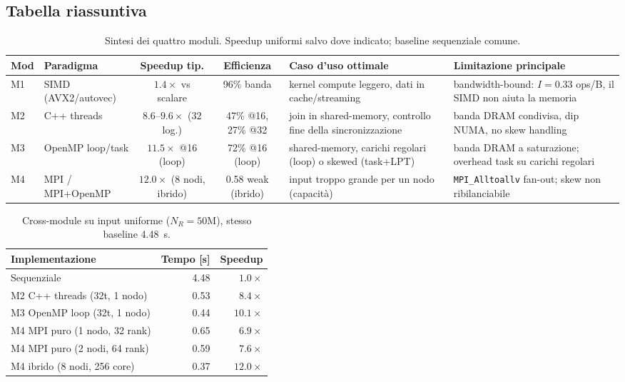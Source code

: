 \documentclass[11pt,a4paper]{article}
\theoremstyle{remark}
\begin{document}
\subsection{Tabella riassuntiva}

\begin{table}[H]
\centering\footnotesize
\setlength{\tabcolsep}{4pt}
\begin{tabularx}{\textwidth}{@{}llcclX@{}}
\toprule
\textbf{Mod} & \textbf{Paradigma} & \textbf{Speedup tip.} & \textbf{Efficienza} & \textbf{Caso d'uso ottimale} & \textbf{Limitazione principale} \\
\midrule
M1 & SIMD (AVX2/autovec) & $1.4\times$ vs scalare & 96\% banda & kernel compute leggero, dati in cache/streaming & bandwidth-bound: $I{=}0.33$ ops/B, il SIMD non aiuta la memoria \\
M2 & C++ threads & $8.6$--$9.6\times$ (32 log.) & 47\% @16, 27\% @32 & join in shared-memory, controllo fine della sincronizzazione & banda DRAM condivisa, dip NUMA, no skew handling \\
M3 & OpenMP loop/task & $11.5\times$ @16 (loop) & 72\% @16 (loop) & shared-memory, carichi regolari (loop) o skewed (task+LPT) & banda DRAM a saturazione; overhead task su carichi regolari \\
M4 & MPI / MPI+OpenMP & $12.0\times$ (8 nodi, ibrido) & 0.58 weak (ibrido) & input troppo grande per un nodo (capacit\`a) & \texttt{MPI\_Alltoallv} fan-out; skew non ribilanciabile \\
\bottomrule
\end{tabularx}
\caption{Sintesi dei quattro moduli. Speedup uniformi salvo dove indicato; baseline sequenziale comune.}
\label{tab:confronto}
\end{table}

\begin{table}[H]
\centering\small
\begin{tabular}{@{}lrr@{}}
\toprule
Implementazione & Tempo [s] & Speedup \\
\midrule
Sequenziale                       & 4.48 & $1.0\times$ \\
M2 C++ threads (32t, 1 nodo)      & 0.53 & $8.4\times$ \\
M3 OpenMP loop (32t, 1 nodo)      & 0.44 & $10.1\times$ \\
M4 MPI puro (1 nodo, 32 rank)     & 0.65 & $6.9\times$ \\
M4 MPI puro (2 nodi, 64 rank)     & 0.59 & $7.6\times$ \\
M4 ibrido (8 nodi, 256 core)      & 0.37 & $12.0\times$ \\
\bottomrule
\end{tabular}
\caption{Cross-module su input uniforme ($N_R{=}50$M), stesso baseline 4.48~s.}
\label{tab:xmod-unif}
\end{table}
\end{document}
